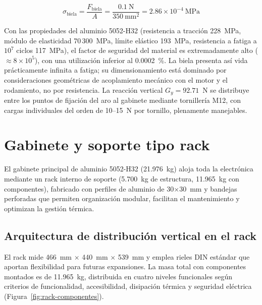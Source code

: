 \begin{equation}
\sigma_{\text{biela}} = \frac{F_{\text{biela}}}{A} = \frac{0.1~\text{N}}{350~\text{mm}^2} = 2.86 \times 10^{-4}~\text{MPa}
\end{equation}

Con las propiedades del aluminio 5052-H32 (resistencia a tracción 228~MPa, módulo de elasticidad 70\,300~MPa, límite elástico 193~MPa, resistencia a fatiga a $10^7$ ciclos 117~MPa), el factor de seguridad del material es extremadamente alto ($\approx 8 \times 10^5$), con una utilización inferior al 0.0002~\%. La biela presenta así vida prácticamente infinita a fatiga; su dimensionamiento está dominado por consideraciones geométricas de acoplamiento mecánico con el motor y el rodamiento, no por resistencia. La reacción vertical $G_y = 92.71$~N se distribuye entre los puntos de fijación del aro al gabinete mediante tornillería M12, con cargas individuales del orden de 10--15~N por tornillo, plenamente manejables.

\section{Gabinete y soporte tipo rack}\label{sec:gabinete-rack}

El gabinete principal de aluminio 5052-H32 (21.976~kg) aloja toda la electrónica mediante un rack interno de soporte (5.700~kg de estructura, 11.965~kg con componentes), fabricado con perfiles de aluminio de 30$\times$30~mm y bandejas perforadas que permiten organización modular, facilitan el mantenimiento y optimizan la gestión térmica.

\subsection{Arquitectura de distribución vertical en el rack}\label{subsec:arquitectura-rack}

El rack mide 466~mm $\times$ 440~mm $\times$ 539~mm y emplea rieles DIN estándar que aportan flexibilidad para futuras expansiones. La masa total con componentes montados es de 11.965~kg, distribuida en cuatro niveles funcionales según criterios de funcionalidad, accesibilidad, disipación térmica y seguridad eléctrica (Figura~\ref{fig:rack-componentes}).

